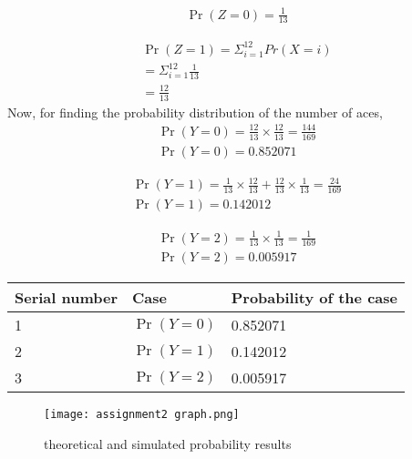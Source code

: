 \documentclass[journal,12pt,twocolumn]{IEEEtran}
\begin{document}
\begin{align}
    \Pr(Z=0) = \frac{1}{13}
\end{align}

\begin{align}
    \Pr(Z=1) = \Sigma_{i=1}^{12} Pr(X=i)
    \\ = \Sigma_{i=1}^{12}\frac{1}{13}
    \\ = \frac{12}{13}
\end{align}
Now, for finding the probability distribution of the number of aces, 
\begin{align}
    \Pr(Y=0) = \frac{12}{13} \times \frac{12}{13} = \frac{144}{169}
    \\\Pr(Y=0) = 0.852071
\end{align}
 

\begin{align}
    \Pr(Y=1) = \frac{1}{13} \times \frac{12}{13} + \frac{12}{13} \times \frac{1}{13} = \frac{24}{169}
    \\\Pr(Y=1) = 0.142012
\end{align}

\begin{align}
    \Pr(Y=2) = \frac{1}{13} \times \frac{1}{13} = \frac{1}{169}
    \\\Pr(Y=2) = 0.005917
\end{align}
\begin{center}
\begin{tabular}{ | m{2.5cm} | m{2cm}| m{4cm} | } 
\hline
Serial number & Case & Probability of the case \\ 
\hline
1 & $\Pr(Y=0)$ & 0.852071 \\ 
\hline
2 & $\Pr(Y=1)$ & 0.142012 \\ 
\hline
3 & $\Pr(Y=2)$ & 0.005917 \\
\hline

\end{tabular}
\end{center}

\begin{figure}[h]
    \texttt{[image: assignment2 graph.png]}
    \caption{theoretical and simulated probability results}
\end{figure}
\end{document}
